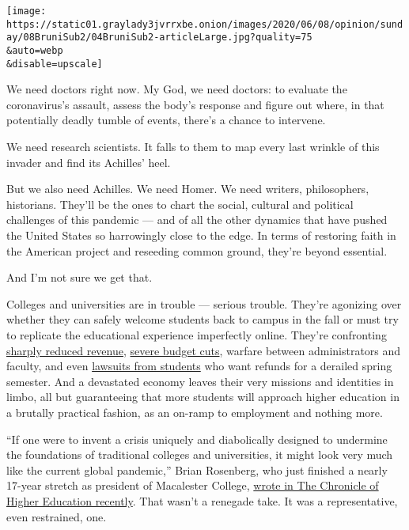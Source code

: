 \texttt{[image: https://static01.graylady3jvrrxbe.onion/images/2020/06/08/opinion/sunday/08BruniSub2/04BruniSub2-articleLarge.jpg?quality=75\\\&auto=webp\\\&disable=upscale]}

We need doctors right now. My God, we need doctors: to evaluate the
coronavirus's assault, assess the body's response and figure out where,
in that potentially deadly tumble of events, there's a chance to
intervene.

We need research scientists. It falls to them to map every last wrinkle
of this invader and find its Achilles' heel.

But we also need Achilles. We need Homer. We need writers, philosophers,
historians. They'll be the ones to chart the social, cultural and
political challenges of this pandemic --- and of all the other dynamics
that have pushed the United States so harrowingly close to the edge. In
terms of restoring faith in the American project and reseeding common
ground, they're beyond essential.

And I'm not sure we get that.

Colleges and universities are in trouble --- serious trouble. They're
agonizing over whether they can safely welcome students back to campus
in the fall or must try to replicate the educational experience
imperfectly online. They're confronting
\href{https://abcnews.go.com/Business/coronavirus-pandemic-brings-staggering-losses-colleges-universities/story?id=70359686}{sharply
reduced revenue},
\href{https://www.wsj.com/articles/public-universities-see-state-funding-disappear-effective-immediately-11587653753?mod=article_inline}{severe
budget cuts}, warfare between administrators and faculty, and even
\href{https://www.nbcnews.com/news/us-news/students-25-universities-sue-refunds-after-campuses-close-due-coronavirus-n1200746}{lawsuits
from students} who want refunds for a derailed spring semester. And a
devastated economy leaves their very missions and identities in limbo,
all but guaranteeing that more students will approach higher education
in a brutally practical fashion, as an on-ramp to employment and nothing
more.

``If one were to invent a crisis uniquely and diabolically designed to
undermine the foundations of traditional colleges and universities, it
might look very much like the current global pandemic,'' Brian
Rosenberg, who just finished a nearly 17-year stretch as president of
Macalester College,
\href{https://www.chronicle.com/article/How-Should-Colleges-Prepare/248507}{wrote
in The Chronicle of Higher Education recently}. That wasn't a renegade
take. It was a representative, even restrained, one.

